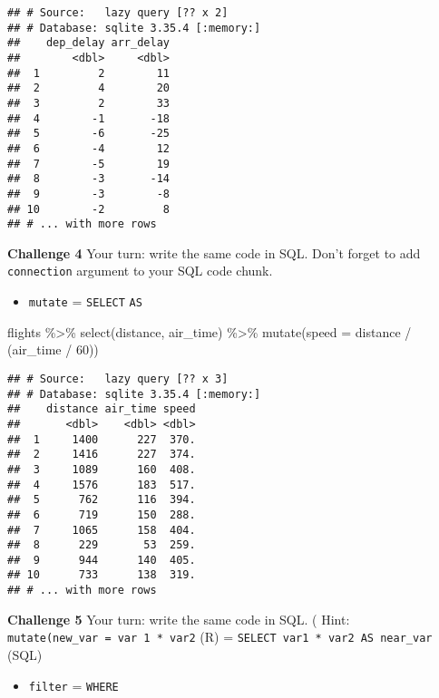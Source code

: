 \documentclass[
]{book}
\newenvironment{Shaded}{\begin{snugshade}}{\end{snugshade}}
\newcommand{\AttributeTok}[1]{\textcolor[rgb]{0.77,0.63,0.00}{#1}}
\newcommand{\DecValTok}[1]{\textcolor[rgb]{0.00,0.00,0.81}{#1}}
\newcommand{\FunctionTok}[1]{\textcolor[rgb]{0.00,0.00,0.00}{#1}}
\newcommand{\NormalTok}[1]{#1}
\newcommand{\SpecialCharTok}[1]{\textcolor[rgb]{0.00,0.00,0.00}{#1}}
\providecommand{\tightlist}{%
  \setlength{\itemsep}{0pt}\setlength{\parskip}{0pt}}
\begin{document}
\begin{verbatim}
## # Source:   lazy query [?? x 2]
## # Database: sqlite 3.35.4 [:memory:]
##    dep_delay arr_delay
##        <dbl>     <dbl>
##  1         2        11
##  2         4        20
##  3         2        33
##  4        -1       -18
##  5        -6       -25
##  6        -4        12
##  7        -5        19
##  8        -3       -14
##  9        -3        -8
## 10        -2         8
## # ... with more rows
\end{verbatim}

\textbf{Challenge 4}
Your turn: write the same code in SQL. Don't forget to add \texttt{connection} argument to your SQL code chunk.

\begin{itemize}
\tightlist
\item
  \texttt{mutate} = \texttt{SELECT} \texttt{AS}
\end{itemize}

\begin{Shaded}
\begin{Highlighting}[]
\NormalTok{flights }\SpecialCharTok{\%\textgreater{}\%}
  \FunctionTok{select}\NormalTok{(distance, air\_time) }\SpecialCharTok{\%\textgreater{}\%}  
  \FunctionTok{mutate}\NormalTok{(}\AttributeTok{speed =}\NormalTok{ distance }\SpecialCharTok{/}\NormalTok{ (air\_time }\SpecialCharTok{/} \DecValTok{60}\NormalTok{)) }
\end{Highlighting}
\end{Shaded}

\begin{verbatim}
## # Source:   lazy query [?? x 3]
## # Database: sqlite 3.35.4 [:memory:]
##    distance air_time speed
##       <dbl>    <dbl> <dbl>
##  1     1400      227  370.
##  2     1416      227  374.
##  3     1089      160  408.
##  4     1576      183  517.
##  5      762      116  394.
##  6      719      150  288.
##  7     1065      158  404.
##  8      229       53  259.
##  9      944      140  405.
## 10      733      138  319.
## # ... with more rows
\end{verbatim}

\textbf{Challenge 5}
Your turn: write the same code in SQL. (
Hint: \texttt{mutate(new\_var\ =\ var\ 1\ *\ var2} (R) = \texttt{SELECT\ var1\ *\ var2\ AS\ near\_var} (SQL)

\begin{itemize}
\tightlist
\item
  \texttt{filter} = \texttt{WHERE}
\end{itemize}
\end{document}
